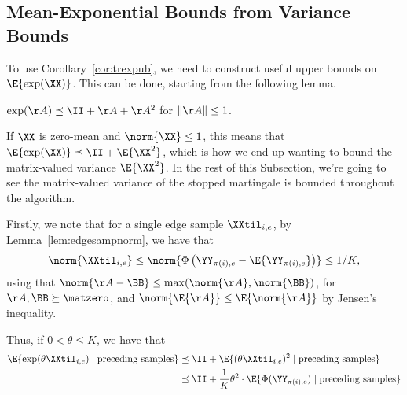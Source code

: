 
\subsection{Mean-Exponential Bounds from Variance Bounds}
To use Corollary~\ref{cor:trexpub}, we need to construct useful upper
bounds on $\E{\exp(\XX)}$.
This can be done, starting from the following lemma.
\begin{lemma}\label{lem:ineq_exp}
  $\exp(\AA) \preceq \II + \AA + \AA^2$ for $\|\AA\|\leq1$.
\end{lemma}
If $\XX$ is zero-mean and $\norm{\XX} \leq 1$,
this means that $\E{\exp(\XX)} \preceq \II + \E{\XX^2}$,
which is how we end up wanting to bound the matrix-valued variance $\E{\XX^2}$.
In the rest of this Subsection, we're going to see the matrix-valued variance of the stopped
martingale is bounded throughout the algorithm.

Firstly, we note that for a single edge sample $\XXtil_{i,e}$,
by Lemma~\ref{lem:edgesampnorm}, we have that
\[
  \norm{\XXtil_{i,e}} \leq
  \norm{\Phi\left( \YY_{\pi(i),e} - \E{\YY_{\pi(i),e}} \right)}
    \leq 1/K,
\]
using that $\norm{\AA-\BB} \leq \max( \norm{\AA}, \norm{\BB} )$, for
$\AA, \BB \succeq \matzero$, and $\norm{\E{\AA}} \leq \E{\norm{\AA}}$
by Jensen's inequality.

Thus, if $0 < \theta \leq K$, we have that
\begin{align}
  \label{eq:edgelogexp}
  \E{ \exp(\theta \XXtil_{i,e}) \mid \text{preceding samples} }
  &\preceq
      \II +
    \E{(\theta \XXtil_{i,e})^2 \mid \text{preceding samples} }
  \\ \nonumber   &\preceq
        \II +
    \frac{1}{K}\theta^2\cdot
    \E{\Phi(\YY_{\pi(i),e}) \mid \text{preceding samples} }
\end{align}



